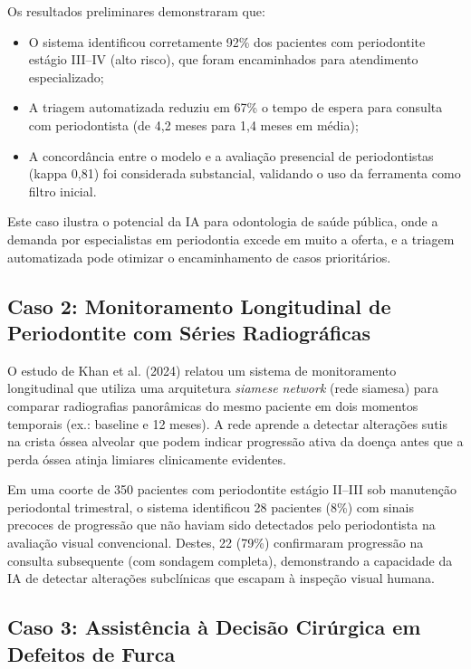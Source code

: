 Os resultados preliminares demonstraram que:
\begin{itemize}
    \item O sistema identificou corretamente 92\% dos pacientes com periodontite estágio III--IV (alto risco), que foram encaminhados para atendimento especializado;
    \item A triagem automatizada reduziu em 67\% o tempo de espera para consulta com periodontista (de 4,2 meses para 1,4 meses em média);
    \item A concordância entre o modelo e a avaliação presencial de periodontistas (kappa 0,81) foi considerada substancial, validando o uso da ferramenta como filtro inicial.
\end{itemize}

Este caso ilustra o potencial da IA para odontologia de saúde pública, onde a demanda por especialistas em periodontia excede em muito a oferta, e a triagem automatizada pode otimizar o encaminhamento de casos prioritários.

\subsection{Caso 2: Monitoramento Longitudinal de Periodontite com Séries Radiográficas}

O estudo de Khan et al. (2024) relatou um sistema de monitoramento longitudinal que utiliza uma arquitetura \textit{siamese network} (rede siamesa) para comparar radiografias panorâmicas do mesmo paciente em dois momentos temporais (ex.: baseline e 12 meses). A rede aprende a detectar alterações sutis na crista óssea alveolar que podem indicar progressão ativa da doença antes que a perda óssea atinja limiares clinicamente evidentes.

Em uma coorte de 350 pacientes com periodontite estágio II--III sob manutenção periodontal trimestral, o sistema identificou 28 pacientes (8\%) com sinais precoces de progressão que não haviam sido detectados pelo periodontista na avaliação visual convencional. Destes, 22 (79\%) confirmaram progressão na consulta subsequente (com sondagem completa), demonstrando a capacidade da IA de detectar alterações subclínicas que escapam à inspeção visual humana.

\subsection{Caso 3: Assistência à Decisão Cirúrgica em Defeitos de Furca}

